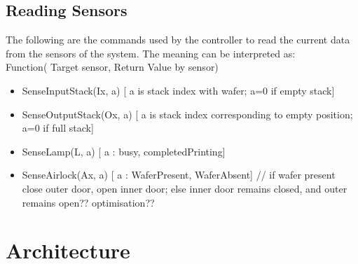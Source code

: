 \documentclass[a4paper,12pt]{article}
\begin{document}
\subsection {Reading Sensors}
The following are the commands used by the controller to read the current data from the sensors of the system. The meaning can be interpreted as:\\
Function( Target sensor, Return Value by sensor)
\begin{itemize}
\item SenseInputStack(Ix, a)              [ a is stack index with wafer; a=0 if empty stack] 
\item SenseOutputStack(Ox, a)          [ a is stack index corresponding to empty position; a=0 if full stack]
\item SenseLamp(L, a)	                  [ a : busy, completedPrinting]	
\item SenseAirlock(Ax, a)                    [ a : WaferPresent, WaferAbsent]  // if wafer present close outer door, open inner door; 												   else inner door remains closed, and outer remains 													   open?? optimisation?? 
\end{itemize}





\section{Architecture}
\end{document}
